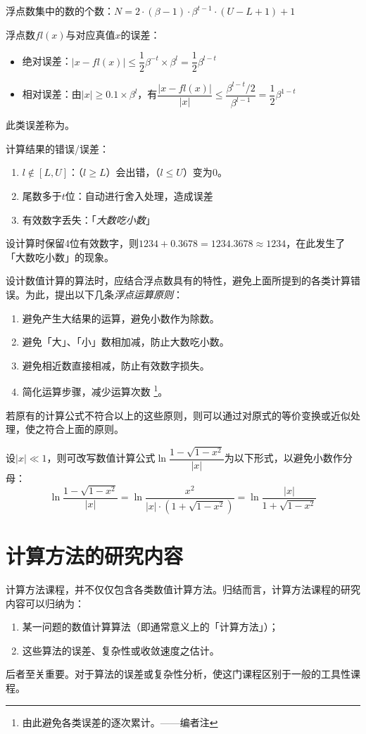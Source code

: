 \entry 浮点数集中的数的个数：$N=2\cdot(\beta-1)\cdot\beta^{t-1}\cdot(U-L+1)+1$

\entry 浮点数$fl(x)$与对应真值$x$的误差：
\begin{itemize}\tl
    \item 绝对误差：$|x-fl(x)|\leq\dfrac12\beta^{-t}\times\beta^l=\dfrac12\beta^{l-t}$
    \item 相对误差：由$|x|\geq0.1\times\beta^l$，有$\dfrac{|x-fl(x)|}{|x|}\leq\dfrac{\beta^{l-t}/2}{\beta^{l-1}}=\dfrac12\beta^{1-t}$
\end{itemize}
此类误差称为。

\entry 计算结果的错误/误差：
\begin{enumerate}\tl
    \item $l\notin[L,U]$：（$l\geq L$）会出错，（$l\leq U$）变为$0$。
    \item 尾数多于$t$位：自动进行舍入处理，造成误差
    \item 有效数字丢失：「\emph{大数吃小数}」
\end{enumerate}


\example 设计算时保留4位有效数字，则$1234+0.3678=1234.3678\approx1234$，在此发生了「大数吃小数」的现象。

\entry 设计数值计算的算法时，应结合浮点数具有的特性，避免上面所提到的各类计算错误。为此，提出以下几条\emph{浮点运算原则}：
\begin{enumerate}\tl
    \item 避免产生大结果的运算，避免小数作为除数。
    \item 避免「大」、「小」数相加减，防止大数吃小数。
    \item 避免相近数直接相减，防止有效数字损失。
    \item 简化运算步骤，减少运算次数
    \footnote{由此避免各类误差的逐次累计。——编者注}。
\end{enumerate}
若原有的计算公式不符合以上的这些原则，则可以通过对原式的等价变换或近似处理，使之符合上面的原则。

\example 设$|x|\ll1$，则可改写数值计算公式$\ln\dfrac{1-\sqrt{1-x^2}}{|x|}$为以下形式，以避免小数作分母：
\[\ln\frac{1-\sqrt{1-x^2}}{|x|}=\ln\frac{x^2}{|x|\cdot(1+\sqrt{1-x^2})}=\ln\frac{|x|}{1+\sqrt{1-x^2}}\]

\section{计算方法的研究内容}
\entry 计算方法课程，并不仅仅包含各类数值计算方法。归结而言，计算方法课程的研究内容可以归纳为：
\begin{enumerate}\tl
    \item 某一问题的数值计算算法（即通常意义上的「计算方法」）；
    \item 这些算法的误差、复杂性或收敛速度之估计。
\end{enumerate}
后者至关重要。对于算法的误差或复杂性分析，使这门课程区别于一般的工具性课程。

